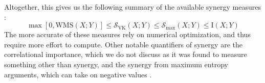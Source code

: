 \documentclass[../main.tex]{subfiles}
\begin{document}
Altogether, this gives us the following summary of the available synergy measures \cite{griffith2014quantifying}:
%
\begin{equation}
\max [0,\mathrm{WMS}\left( X;Y \right)] \le \mathcal{S}_\mathrm{VK} \left( X;Y \right) \le \mathcal{S}_\mathrm{max} \left( X;Y \right) \le \mathrm{I}\left( X;Y \right)
\end{equation}
%
The more accurate of these measures rely on numerical optimization, and thus require more effort to compute.
Other notable quantifiers of synergy are the correlational importance, which we do not discuss as it was found to measure something other than synergy, and the synergy from maximum entropy arguments, which can take on negative values \cite{griffith2014quantifying, olbrich2015information}.
\end{document}
